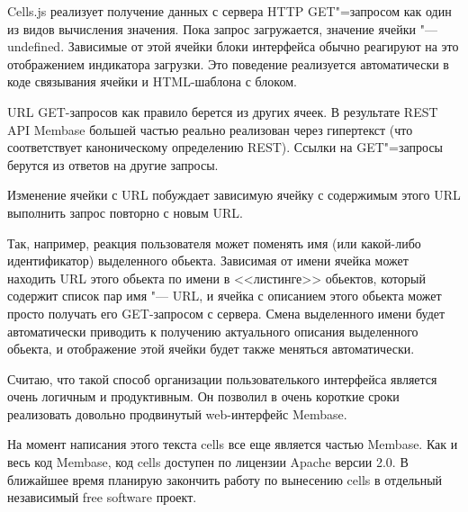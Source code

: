 \documentclass[10pt, a5paper]{article}
\begin{document}
Cells.js реализует получение данных с сервера HTTP GET"=запросом как
один из видов вычисления значения. Пока запрос загружается, значение
ячейки "--- undefined. Зависимые от этой ячейки блоки интерфейса
обычно реагируют на это отображением индикатора загрузки. Это
поведение реализуется автоматически в коде связывания ячейки и
HTML-шаблона с блоком.

URL GET-запросов как правило берется из других ячеек. В результате
REST API Membase большей частью реально реализован через гипертекст
(что соответствует каноническому определению REST). Ссылки на GET"=запросы 
берутся из ответов на другие запросы.

Изменение ячейки с URL побуждает зависимую ячейку с содержимым этого
URL выполнить запрос повторно с новым URL.

Так, например, реакция пользователя может поменять имя (или какой-либо
идентификатор) выделенного обьекта. Зависимая от \linebreak имени ячейка может
находить URL этого обьекта по имени в <<листинге>> обьектов, который
содержит список пар имя "--- URL, и ячейка с описанием этого обьекта может
просто получать его GET-запросом с сервера. Смена выделенного имени
будет автоматически приводить к получению актуального описания
выделенного обьекта, и отображение этой ячейки будет также меняться
автоматически.

Считаю, что такой способ организации пользователького интерфейса
является очень логичным и продуктивным.  Он позволил в очень
короткие сроки реализовать довольно продвинутый web-интерфейс Membase.

На момент написания этого текста cells все еще является частью
Membase. Как и весь код Membase, код cells доступен по лицензии Apache
версии 2.0. В ближайшее время планирую закончить работу по вынесению
cells в отдельный независимый free software проект.
\end{document}
